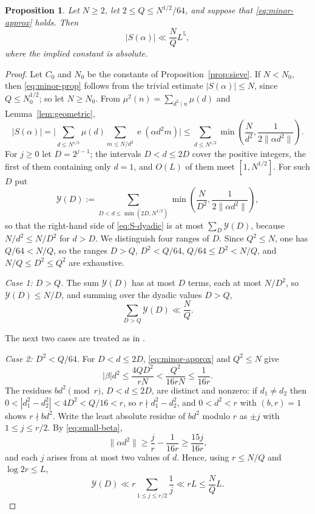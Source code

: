 \documentclass[11pt]{amsart}
\numberwithin{equation}{section}
\numberwithin{figure}{section}
\newtheorem{proposition}{Proposition}[section]
\theoremstyle{definition}
\newcommand{\e}{\operatorname{e}}
\begin{document}
\begin{proposition}\label{prop:minor}
Let $N\ge2$, let $2\le Q\le N^{1/2}/64$, and suppose that
\eqref{eq:minor-approx} holds.  Then
\begin{equation}\label{eq:minor-prop}
  |S(\alpha)|\ll\frac NQL^5,
\end{equation}
where the implied constant is absolute.
\end{proposition}

\begin{proof}
Let $C_0$ and $N_0$ be the constants of Proposition~\ref{prop:sieve}.  If
$N<N_0$, then \eqref{eq:minor-prop} follows from the trivial estimate
$|S(\alpha)|\le N$, since $Q\le N_0^{1/2}$; so let $N\ge N_0$.  From
$\mu^2(n)=\sum_{d^2\mid n}\mu(d)$ and Lemma~\ref{lem:geometric},
\begin{equation}\label{eq:S-dyadic}
  |S(\alpha)|
  =\bigg|\sum_{d\le N^{1/2}}\mu(d)\sum_{m\le N/d^2}\e(\alpha d^2m)\bigg|
  \le\sum_{d\le N^{1/2}}\min\left(\frac N{d^2},\frac1{2\|\alpha d^2\|}\right).
\end{equation}
For $j\ge0$ let $D=2^{j-1}$; the intervals $D<d\le2D$ cover the positive
integers, the first of them containing only $d=1$, and $O(L)$ of them meet
$[1,N^{1/2}]$.  For such $D$ put
\begin{equation}\label{eq:Y-def}
  \mathcal Y(D):=\sum_{D<d\le\min(2D,N^{1/2})}
  \min\left(\frac N{D^2},\frac1{2\|\alpha d^2\|}\right),
\end{equation}
so that the right-hand side of \eqref{eq:S-dyadic} is at most
$\sum_D\mathcal Y(D)$, because $N/d^2\le N/D^2$ for $d>D$.  We distinguish
four ranges of $D$.  Since $Q^2\le N$, one has $Q/64<N/Q$, so the ranges
$D>Q$, $D^2<Q/64$, $Q/64\le D^2<N/Q$, and $N/Q\le D^2\le Q^2$ are
exhaustive.

\medskip\noindent\emph{Case 1: $D>Q$.}
The sum $\mathcal Y(D)$ has at most $D$ terms, each at most $N/D^2$, so
$\mathcal Y(D)\le N/D$, and summing over the dyadic values $D>Q$,
\begin{equation}\label{eq:case1}
  \sum_{D>Q}\mathcal Y(D)\ll\frac NQ.
\end{equation}

The next two cases are treated as in \cite[p.~595--596]{BP}.

\medskip\noindent\emph{Case 2: $D^2<Q/64$.}
For $D<d\le2D$, \eqref{eq:minor-approx} and $Q^2\le N$ give
\begin{equation}\label{eq:small-beta}
  |\beta|d^2\le\frac{4QD^2}{rN}<\frac{Q^2}{16rN}\le\frac1{16r}.
\end{equation}
The residues $bd^2\pmod r$, $D<d\le2D$, are distinct and nonzero: if
$d_1\ne d_2$ then $0<|d_1^2-d_2^2|<4D^2<Q/16<r$, so $r\nmid d_1^2-d_2^2$,
and $0<d^2<r$ with $(b,r)=1$ shows $r\nmid bd^2$.  Write the least
absolute residue of $bd^2$ modulo $r$ as $\pm j$ with $1\le j\le r/2$.
By \eqref{eq:small-beta},
\[
  \|\alpha d^2\|\ge\frac jr-\frac1{16r}\ge\frac{15j}{16r},
\]
and each $j$ arises from at most two values of $d$.  Hence, using
$r\le N/Q$ and $\log2r\le L$,
\begin{equation}\label{eq:case2}
  \mathcal Y(D)\ll r\sum_{1\le j\le r/2}\frac1j\ll rL\le\frac NQL.
\end{equation}


\end{proof}
\end{document}

